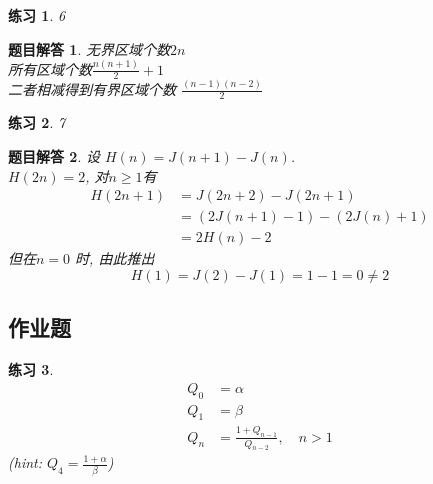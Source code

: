 \documentclass[mode=geye, chinesefont=founder]{elegantnote}
\newtheorem{exercise}{练习}
\newtheorem{answer}{题目解答}
\begin{document}
\begin{exercise}6
\end{exercise}

\begin{answer}
	无界区域个数$ 2n $\\
	所有区域个数$ \frac{n(n+1)}{2}+1 $ \\
	二者相减得到有界区域个数 $ \frac{(n-1)(n-2)}{2} $
\end{answer}

\begin{exercise}7
\end{exercise}

\begin{answer}
	设 $ H(n) = J(n+1) - J(n) $.\\
	$ H(2n) = 2 $, 对$ n\geqslant 1 $有\\
	\begin{align*}
		 H(2n+1)
		 &= J(2n+2) - J(2n+1) \\
		 &= (2J(n+1)-1) - (2J(n)+1)\\
		 &= 2H(n) - 2
	\end{align*}
	但在$ n=0 $	时, 由此推出
	\begin{equation*}
		H(1) = J(2)-J(1) = 1 - 1 = 0 \neq 2
	\end{equation*}
\end{answer}

\subsection{作业题}
\begin{exercise}	
	\begin{align*}
		Q_0 &= \alpha\\
		Q_1 &= \beta \\
		Q_n &= \frac{1+Q_{n-1}}{Q_{n-2}} ,\quad n>1
	\end{align*}
	(hint: $ Q_4 = \frac{1+\alpha}{\beta} $)
\end{exercise}
\end{document}
